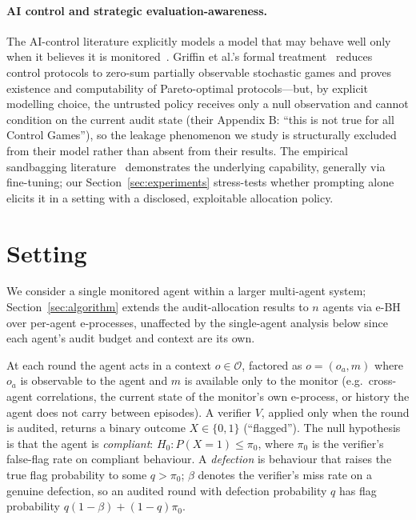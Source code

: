 \documentclass[sigconf,anonymous]{aamas}
\theoremstyle{plain}
\theoremstyle{definition}
\begin{document}
\paragraph{AI control and strategic evaluation-awareness.}
The AI-control literature explicitly models a model that may behave well
only when it believes it is monitored~\cite{greenblatt2024aicontrol}.
Griffin et al.'s formal treatment~\cite{griffin2024games} reduces control
protocols to zero-sum partially observable stochastic games and proves
existence and computability of Pareto-optimal protocols---but, by explicit
modelling choice, the untrusted policy receives only a null observation and
cannot condition on the current audit state (their Appendix B: ``this is not
true for all Control Games''), so the leakage phenomenon we study is
structurally excluded from their model rather than absent from their
results. The empirical sandbagging
literature~\cite{vanderweij2025sandbagging_full,tice2025noise,dyer2025sandbagging}
demonstrates the underlying capability, generally via fine-tuning; our
Section~\ref{sec:experiments} stress-tests whether prompting alone elicits
it in a setting with a disclosed, exploitable allocation policy.

\section{Setting}
\label{sec:setting}

We consider a single monitored agent within a larger multi-agent system;
Section~\ref{sec:algorithm} extends the audit-allocation results to $n$
agents via e-BH over per-agent e-processes, unaffected by the single-agent
analysis below since each agent's audit budget and context are its own.

At each round the agent acts in a context $o \in \mathcal{O}$, factored as
$o = (o_a, m)$ where $o_a$ is observable to the agent and $m$ is available
only to the monitor (e.g.\ cross-agent correlations, the current state of
the monitor's own e-process, or history the agent does not carry between
episodes). A verifier $V$, applied only when the round is audited, returns a
binary outcome $X \in \{0,1\}$ (``flagged''). The null hypothesis is that the
agent is \emph{compliant}: $H_0 : P(X=1) \le \pi_0$, where $\pi_0$ is the
verifier's false-flag rate on compliant behaviour. A \emph{defection} is
behaviour that raises the true flag probability to some $q > \pi_0$; $\beta$
denotes the verifier's miss rate on a genuine defection, so an audited round
with defection probability $q$ has flag probability
$q(1-\beta) + (1-q)\pi_0$.
\end{document}
